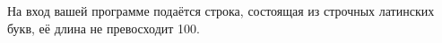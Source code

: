 На вход вашей программе подаётся строка, состоящая из строчных латинских букв, её длина не превосходит 100.